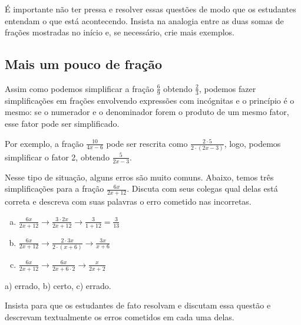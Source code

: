 \documentclass[main.tex]{subfiles}
\begin{document}
\paraTutores

É importante não ter pressa e resolver essas questões de modo que os estudantes entendam o que está acontecendo. Insista na analogia entre as duas somas de frações mostradas no início e, se necessário, crie mais exemplos.

\paraAmbos

\subsection*{Mais um pouco de fração}

Assim como podemos simplificar a fração $\frac{6}{9}$ obtendo $\frac{2}{3}$, podemos fazer simplificações em frações envolvendo expressões com incógnitas e o princípio é o mesmo: se o numerador e o denominador forem o produto de um mesmo fator, esse fator pode ser simplificado.

Por exemplo, a fração $\frac{10}{4x-6}$ pode ser rescrita como $\frac{2 \cdot 5}{2 \cdot (2x-3)}$, logo, podemos simplificar o fator 2, obtendo $\frac{5}{2x-3}$.

\begin{questao}
Nesse tipo de situação, alguns erros são muito comuns. Abaixo, temos três simplificações para a fração $\frac{6x}{2x+12}$. Discuta com seus colegas qual delas está correta e descreva com suas palavras o erro cometido nas incorretas.
\begin{enumerate}[a)]
\item $\frac{6x}{2x+12} \longrightarrow \frac{3 \cdot 2x}{2x+12} \longrightarrow \frac{3}{1+12} = \frac{3}{13}$
\item $\frac{6x}{2x+12} \longrightarrow \frac{2 \cdot 3x}{2 \cdot(x+6)} \longrightarrow \frac{3x}{x+6}$
\item $\frac{6x}{2x+12} \longrightarrow \frac{6x}{2x+6 \cdot 2} \longrightarrow \frac{x}{2x+2}$
\end{enumerate}
\end{questao}

\begin{gabarito}
	\begin{gabaritoQuestao}
		a) errado, b) certo, c) errado.
	\end{gabaritoQuestao}
\end{gabarito}

\paraTutores

Insista para que os estudantes de fato resolvam e discutam essa questão e descrevam textualmente os erros cometidos em cada uma delas.
\end{document}
